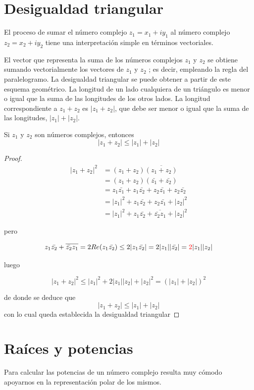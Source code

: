 \documentclass{apuntes}
\begin{document}
\section{Desigualdad triangular}
El proceso de sumar el número complejo $z_1 = x_1 + iy_1$ al número complejo $z_2 = x_2 + iy_2$ tiene una interpretación simple en términos vectoriales.

El vector que representa la suma de los números complejos $z_1$ y $z_2$ se obtiene sumando vectorialmente los vectores de $z_1$ y $z_2$ ; es decir, empleando la regla del paralelogramo. La desigualdad triangular se puede obtener a partir de este esquema
geométrico. La longitud de un lado cualquiera de un triángulo es menor o igual que la suma de las longitudes de los otros lados. La longitud correspondiente a $z_1 + z_2$ es $|z_1 + z_2 |$, que debe ser menor o igual que la suma de las longitudes, $|z_1 | + |z_2 |$.

\begin{prop}
Si $z_1$ y $z_2$ son números complejos, entonces
\[|z_1+z_2|\leq |z_1|+|z_2|\]
\end{prop}
\begin{proof}
\begin{align*}
|z_1+z_2|^2 & = (z_1+z_2)\overline{(z_1+z_2)} \\
& = (z_1+z_2)(\bar{z_1}+\bar{z_2}) \\
& = z_1\bar{z_1}+z_1\bar{z_2}+z_2\bar{z_1}+z_2\bar{z_2} \\
& = |z_1|^2+z_1\bar{z_2}+z_2\bar{z_1}+|z_2|^2 \\
& = |z_1|^2+z_1\bar{z_2}+\overline{\bar{z_2}z_1}+|z_2|^2
\end{align*}

pero

\[z_1\bar{z_2}+\overline{\bar{z_2}z_1} = 2 Re(z_1\bar{z_2}) \leq 2|z_1\bar{z_2}| = 2 |z_1||\bar{z_2}| = \textcolor{red}{2}|z_1||z_2|\]

luego

\[|z_1+z_2|^2 \leq |z_1|^2+2|z_1||z_2|+|z_2|^2 = (|z_1|+|z_2|)^2\]

de donde se deduce que
\[|z_1+z_2| \leq |z_1|+|z_2|\]
con lo cual queda establecida la desigualdad triangular
\end{proof}

\section{Raíces y potencias}
Para calcular las potencias de un número complejo resulta muy cómodo apoyarnos en la representación polar de los mismos.
\end{document}

